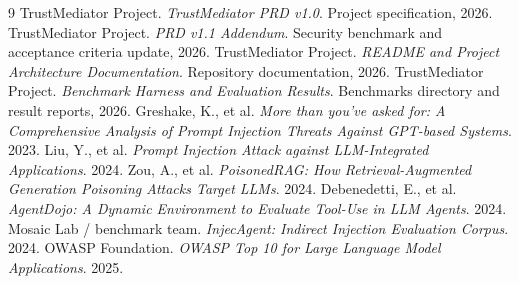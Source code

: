 \documentclass[12pt]{article}
\begin{document}
\begin{thebibliography}{9}
 TrustMediator Project. \emph{TrustMediator PRD v1.0}. Project specification, 2026.
 TrustMediator Project. \emph{PRD v1.1 Addendum}. Security benchmark and acceptance criteria update, 2026.
 TrustMediator Project. \emph{README and Project Architecture Documentation}. Repository documentation, 2026.
 TrustMediator Project. \emph{Benchmark Harness and Evaluation Results}. Benchmarks directory and result reports, 2026.
 Greshake, K., et al. \emph{More than you’ve asked for: A Comprehensive Analysis of Prompt Injection Threats Against GPT-based Systems}. 2023.
 Liu, Y., et al. \emph{Prompt Injection Attack against LLM-Integrated Applications}. 2024.
 Zou, A., et al. \emph{PoisonedRAG: How Retrieval-Augmented Generation Poisoning Attacks Target LLMs}. 2024.
 Debenedetti, E., et al. \emph{AgentDojo: A Dynamic Environment to Evaluate Tool-Use in LLM Agents}. 2024.
 Mosaic Lab / benchmark team. \emph{InjecAgent: Indirect Injection Evaluation Corpus}. 2024.
 OWASP Foundation. \emph{OWASP Top 10 for Large Language Model Applications}. 2025.
\end{thebibliography}
\end{document}
